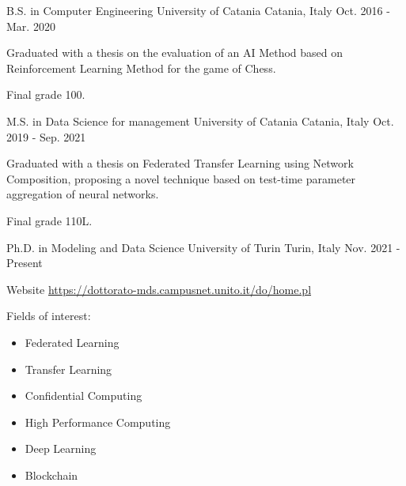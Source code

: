 

\begin{cventries}

  \cventry
    {B.S. in Computer Engineering} %
    {University of Catania} %
    {Catania, Italy} %
    {Oct. 2016 - Mar. 2020} %
    {
      \begin{cvitems} %
        \item {Graduated with a thesis on the evaluation of an AI Method based on Reinforcement Learning Method for the game of Chess.}
        \item {Final grade 100.}
      \end{cvitems}
    }


  \cventry
    {M.S. in Data Science for management} %
    {University of Catania} %
    {Catania, Italy} %
    {Oct. 2019 - Sep. 2021} %
    {
      \begin{cvitems} %
        \item {Graduated with a thesis on Federated Transfer Learning using Network Composition, proposing a novel technique based on test-time parameter aggregation of neural networks.}
        \item {Final grade 110L.}
      \end{cvitems}
    }


  \cventry
    {Ph.D. in Modeling and Data Science} %
    {University of Turin} %
    {Turin, Italy} %
    {Nov. 2021 - Present} %
    {
      \begin{cvitems} %
        \item {Website \href{https://dottorato-mds.campusnet.unito.it/do/home.pl}{https://dottorato-mds.campusnet.unito.it/do/home.pl}}
        \item {Fields of interest: \begin{itemize}
        \item Federated Learning
        \item Transfer Learning
        \item Confidential Computing
        \item High Performance Computing
        \item Deep Learning
        \item Blockchain
        \end{itemize}}
      \end{cvitems}
    }


\end{cventries}
